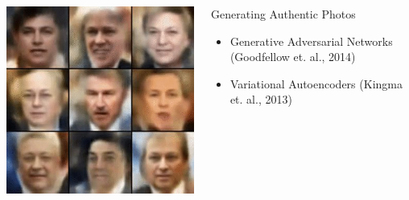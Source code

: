 \begin{frame}
    \begin{columns}            
        \begin{column}{0.6\textwidth}
            \begin{overlayarea}{\textwidth}{\textheight}
                \vspace{0.2in}
                \includegraphics[scale=0.5]{images/va}
            \end{overlayarea}
        \end{column}
        \begin{column}{0.4\textwidth}
            \begin{overlayarea}{\textwidth}{\textheight}
                \begin{block}{Generating Authentic Photos}
                    \begin{itemize}
                        \item Generative Adversarial Networks (Goodfellow et. al., 2014)
                        \item Variational Autoencoders (Kingma et. al., 2013)
                    \end{itemize}
                \end{block}
            \end{overlayarea}
        \end{column}
    \end{columns}
\end{frame}

